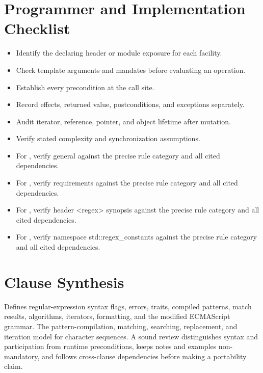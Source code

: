 \documentclass[11pt,letterpaper]{article}
\begin{document}
\section{Programmer and Implementation Checklist}
\begin{CornellReferenceChecklistBox}\begin{itemize}[label=$\square$]
\item Identify the declaring header or module exposure for each facility.
\item Check template arguments and mandates before evaluating an operation.
\item Establish every precondition at the call site.
\item Record effects, returned value, postconditions, and exceptions separately.
\item Audit iterator, reference, pointer, and object lifetime after mutation.
\item Verify stated complexity and synchronization assumptions.
\item For , verify general against the precise rule category and all cited dependencies.
\item For , verify requirements against the precise rule category and all cited dependencies.
\item For , verify header <regex> synopsis against the precise rule category and all cited dependencies.
\item For , verify namespace std::regex\_\allowbreak{}constants against the precise rule category and all cited dependencies.
\end{itemize}\end{CornellReferenceChecklistBox}
\section{Clause Synthesis}
\begin{CornellReferenceOrientationBox}Defines regular-expression syntax flags, errors, traits, compiled patterns, match results, algorithms, iterators, formatting, and the modified ECMAScript grammar. The pattern-compilation, matching, searching, replacement, and iteration model for character sequences. A sound review distinguishes syntax and participation from runtime preconditions, keeps notes and examples non-mandatory, and follows cross-clause dependencies before making a portability claim.\end{CornellReferenceOrientationBox}
\end{document}
